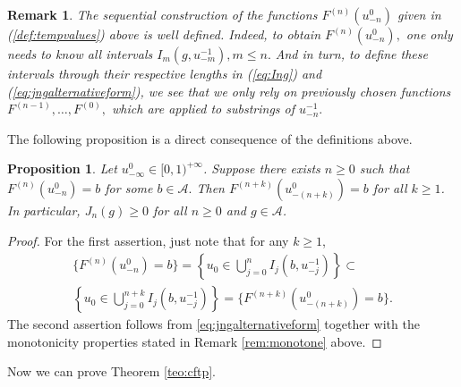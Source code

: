 \documentclass[a4paper]{article}
\newtheorem{proposition}{Proposition}%
\newtheorem{remark}{Remark}%
\newcommand{\A}{\mathcal{A}}
\begin{document}
\begin{remark} The sequential construction of the functions $ F^{(n)} (u_{-n}^0)$ given in (\ref{def:tempvalues}) above is well defined. Indeed, to obtain $ F^{(n)} (u_{-n}^0), $ one only needs to know all 
intervals $ I_m ( g, u^{- 1}_{-m}) , m \le n .$ And in turn, to define these intervals through their respective lengths in (\ref{eq:Ing}) and (\ref{eq:jngalternativeform}), we see that we only rely on previously chosen functions $ F^{(n-1)}, \ldots, F^{(0)}, $ which are applied to substrings of $ u_{-n}^{-1}.$ 
\end{remark}

The following proposition is a direct consequence of the definitions above. 

\begin{proposition}\label{prop:monotone} 
Let $u_{-\infty}^0\in [0,1)^{+\infty}$. Suppose there exists $ n \geq 0 $ such that $ F^{(n)}(u_{-n}^0) = b$ for some $b \in \A.$ Then $ F^{(n+k)}(u_{-(n+k)}^0) = b$ for all $k\geq 1$. In particular, $J_n (g) \geq 0$ for all $ n \geq 0$ and $g\in \A$.
\end{proposition}
\begin{proof}
For the first assertion, just note that for any $k\geq 1$,
\begin{multline*}
\{F^{(n)}(u_{-n}^0) = b\}=\left\{u_{0} \in \bigcup_{j=0}^{n}I_{j}(b,u_{-j}^{-1})\right\} \subset \\ \left\{u_{0} \in \bigcup_{j=0}^{n+k}I_{j}(b,u_{-j}^{-1})\right\}=\{F^{(n+k)}(u_{-(n+k)}^0) = b\}.
\end{multline*}
The second assertion follows from \eqref{eq:jngalternativeform}
together with the monotonicity properties stated in Remark \ref{rem:monotone} above.
\end{proof}



Now we can prove Theorem \ref{teo:cftp}. 
\end{document}
